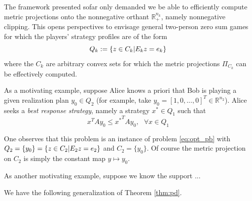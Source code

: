 \documentclass{article} %
\begin{document}
The framework presented sofar only demanded we be able to efficiently compute metric projections onto the nonnegative orthant $\mathbb{R}^{n_k}_+$, namely nonnegative clipping. This opens perspectives to envisage general two-person zero sum games for which the players' strategy profiles are of the form
\begin{equation}
  Q_k := \{z \in C_k| E_kz = e_k\text\}
  \label{eq:q_gen}
\end{equation}
where the $C_k$ are arbitrary convex sets for which the metric projections $\Pi_{C_k}$ can be effectively computed.

As a motivating example, suppose Alice knows a priori that Bob is playing a given realization plan $y_0 \in Q_2$ (for example, take $y_0 = [1, 0, ..., 0]^T \in \mathbb{R}^{n_2}$). Alice seeks a \textit{best response strategy}, namely a strategy $x^* \in Q_1$ such that
\begin{equation}
  x^TAy_0 \le {x^*}^TAy_0,\text{ } \forall x \in Q_1
\end{equation}

One observes that this problem is an instance of problem \eqref{eq:opt_pb} with
$Q_2 = \{y_0\} = \{z \in C_2| E_2z = e_2\text\}$ and $C_2 = \{y_0\}$. Of course the metric projection on $C_2$ is simply the constant map $y \mapsto y_0$.

As another motivating example, suppose we know the support ...

We have the following generalization of Theorem \ref{thm:pd}.
\end{document}
